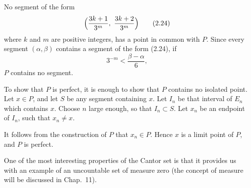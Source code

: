 No segment of the form
\begin{equation}
  \Bigl(\frac{3k+1}{3^m},\ \frac{3k+2}{3^m}\Bigr) \tag{2.24}
\end{equation}
where $k$ and $m$ are positive integers, has a point in common with $P$. Since
every segment $(\alpha,\beta)$ contains a segment of the form (2.24), if
\[ 3^{-m} < \frac{\beta-\alpha}{6}, \]
$P$ contains no segment.

To show that $P$ is perfect, it is enough to show that $P$ contains no isolated
point. Let $x \in P$, and let $S$ be any segment containing $x$. Let $I_n$ be
that interval of $E_n$ which contains $x$. Choose $n$ large enough, so that
$I_n \subset S$. Let $x_n$ be an endpoint of $I_n$, such that $x_n \ne x$.

It follows from the construction of $P$ that $x_n \in P$. Hence $x$ is a limit
point of $P$, and $P$ is perfect.

One of the most interesting properties of the Cantor set is that it provides us
with an example of an uncountable set of measure zero (the concept of measure
will be discussed in Chap.\ 11).

